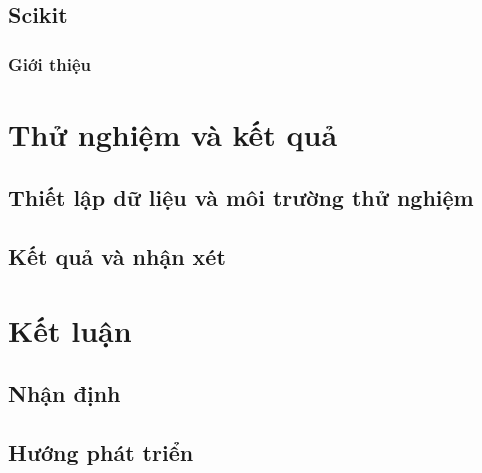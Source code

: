 \documentclass{article}
\begin{document}
\begin{flushleft}
        \subsection{Scikit}
        \subsubsection{Giới thiệu}
        \newpage
        \section{Thử nghiệm và kết quả}
        \subsection{Thiết lập dữ liệu và môi trường thử nghiệm}
        \subsection{Kết quả và nhận xét}
        \newpage
        \section{Kết luận}
        \subsection{Nhận định}
        \subsection{Hướng phát triển}
    \end{flushleft}
    \newpage
     
    
\end{document}

